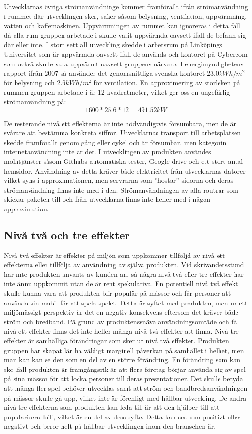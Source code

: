 Utvecklarnas övriga strömanvändninge kommer framförallt ifrån strömanvändning i rummet där utvecklingen sker, saker såsom belysning, ventilation, uppvärmning, vatten och kaffemaskinen. Uppvärmningen av rummet kan ignoreras i detta fall då alla rum gruppen arbetade i skulle varit uppvärmda oavsett ifall de befann sig där eller inte. I stort sett all utveckling skedde i arbetsrum på Linköpings Universitet som är uppvärmda oavsett ifall de används och kontoret på Cybercom som också skulle vara uppvärmt oavsett gruppens närvaro. I energimyndighetens rapport ifrån 2007\cite{emynd} så använder det genomsnittliga svenska kontoret $23.0kWh/m^2$ för belysning och $2.6kWh/m^2$ för ventilation. En approximering av storleken på rummen gruppen arbetade i är 12 kvadratmeter, vilket ger oss en ungefärlig strömanvändning på: $$1600 * 25.6 * 12 = 491.52kW$$

De resterande nivå ett effekterna är inte nödvändigtvis försumbara, men de är svårare att bestämma konkreta siffror. Utvecklarnas transport till arbetsplatsen skedde framförallt genom gång eller cykel och är försumbar, men kategorin internetanvändning inte är det. I utvecklingen av produkten användes molntjänster såsom Githubs automatiska tester, Google drive och ett stort antal hemsidor. Användning av detta kräver både elektricitet från utvecklarnas datorer vilket syns i approximationen, men servrarna som ''hostar'' sidorna och deras strömanvändning  finns inte med i den. Strömanvändningen av alla routrar som skickar paketen till och från utvecklarna finns inte heller med i någon approximation.

\subsection{Nivå två och tre effekter}
Nivå två effekter är effekter på miljön som uppkommer tillföljd av nivå ett effekterna eller tillfölja av användning av själva produkten. Vid skrivandetsstund har inte produkten använts av kunden än, så några nivå två eller tre effekter har inte ännu uppkommit utan de är rent spekulativa. En potentiell nivå två effekt skulle kunna vara att produkten blir populär på mässor och får personer att använda sin mobil för att spela spelet. Detta är syftet med produkten, men ur ett miljömässigt perspektiv är det en negativ konsekvens eftersom det kräver både ström och bredband. På grund av produktenssnäva användningsområde och få nivå ett effekter finns det inte heller många nivå två effekter att finna. Nivå tre effekter är samhälliga förändringar som sker ur nivå två effekter. Produkten gruppen har skapat lär ha väldigt marginell påverkan på samhället i helhet, men man kan kan se den som en del av en större förändring. En förändring som kan ske ifall produkten är framgångsrik är att flera företag börjar använda sig av spel på sina mässor för att locka personer till deras presentationer. Det skulle betyda att många fler spel behöver utvecklas samt att ström och bandbredsanvändningen på mässor skulle gå upp, vilket inte är förenligt med hållbar utveckling. De andra nivå tre effekterna som produkten kan leda till är att den hjälper till att popularisera IoT, vilket är en del av dess syfte. Detta kan ses som positivt eller negativt och beror helt på hållbar utvecklingen inom den branschen är. 



